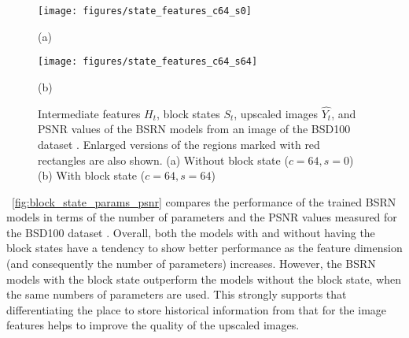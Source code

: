 \documentclass[runningheads]{llncs}
\begin{document}
\begin{figure*}[t!]
	\begin{center}
		\centering
		\begin{minipage}[b]{0.995\linewidth}
			\centering
			\centerline{\texttt{[image: figures/state\_features\_c64\_s0]}}
			\centerline{(a)}
		\end{minipage}
		\begin{minipage}[b]{0.995\linewidth}
			\centering
			\centerline{\texttt{[image: figures/state\_features\_c64\_s64]}}
			\centerline{(b)}
		\end{minipage}
	\end{center}
	\caption{Intermediate features ${H}_{t}$, block states ${S}_{t}$, upscaled images $\widehat{{Y}_{t}}$, and PSNR values of the BSRN models from an image of the BSD100 dataset \cite{martin2001database}. Enlarged versions of the regions marked with red rectangles are also shown. (a) Without block state ($c=64, s=0$) (b) With block state ($c=64, s=64$)}
	\label{fig:state_features}
\end{figure*}

\figurename~\ref{fig:block_state_params_psnr} compares the performance of the trained BSRN models in terms of the number of parameters and the PSNR values measured for the BSD100 dataset \cite{martin2001database}.
Overall, both the models with and without having the block states have a tendency to show better performance as the feature dimension (and consequently the number of parameters) increases.
However, the BSRN models with the block state outperform the models without the block state, when the same numbers of parameters are used.
This strongly supports that differentiating the place to store historical information from that for the image features helps to improve the quality of the upscaled images.
\end{document}

